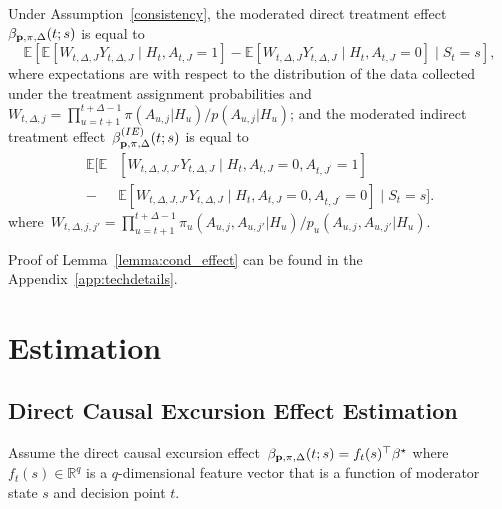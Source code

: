 \documentclass[lineno]{biometrika}
\begin{document}
\begin{lemma}
\label{lemma:cond_effect}
  Under Assumption~\ref{consistency}, the moderated direct treatment effect~$\beta_{{\bf p}, \pi, \Delta} (t;s)$ is equal to
  $$
  \mathbb{E} \left[ \mathbb{E} \left[ W_{t, \Delta, J} Y_{t,\Delta,J} \mid H_{t}, A_{t,J} = 1 \right] - \mathbb{E} \left[ W_{t, \Delta, J} Y_{t, \Delta,J} \mid H_{t}, A_{t,J} = 0 \right] \mid S_t=s \right],
  $$
  where expectations are with respect to the distribution of the
  data collected under the treatment assignment probabilities and~$W_{t,\Delta,j} = \prod_{u=t+1}^{t+\Delta-1} \pi(A_{u,j} | H_u) / p(A_{u,j} | H_u)$; and the moderated indirect treatment effect~$\beta^{(IE)}_{{\bf p}, \pi, \Delta}(t;s) $ is equal to
  \begin{align*}
  \mathbb{E} \bigg[ \mathbb{E} &\left[ W_{t,\Delta,J,J'} Y_{t,\Delta,J} \mid H_{t}, A_{t,J} = 0, A_{t,J^\prime} = 1 \right] \\
  - &\mathbb{E} \left[ W_{t,\Delta,J,J'} Y_{t,\Delta,J} \mid H_{t}, A_{t,J} = 0, A_{t,J^\prime} = 0 \right] \mid S_t=s \bigg].
  \end{align*}
\noindent where~$W_{t,\Delta,j,j'} = \prod_{u=t+1}^{t+\Delta-1} \pi_u(A_{u,j}, A_{u,j'} | H_u) / p_u(A_{u,j}, A_{u,j'} | H_u)$.
\end{lemma}
\noindent Proof of Lemma~\ref{lemma:cond_effect} can be found in the Appendix~\ref{app:techdetails}.


\section{Estimation}
\label{section:estimation}


\subsection{Direct Causal Excursion Effect Estimation}

\begin{assumption} \normalfont
\label{ass:directeffect}
Assume the direct causal excursion effect~$\beta_{{\bf p}, \pi, \Delta}(t;s) = f_t (s)^\top \beta^\star$ where $f_t (s) \in \mathbb{R}^q$ is a $q$-dimensional feature vector that is a function of moderator state $s$ and decision point $t$. \end{assumption}
\end{document}
